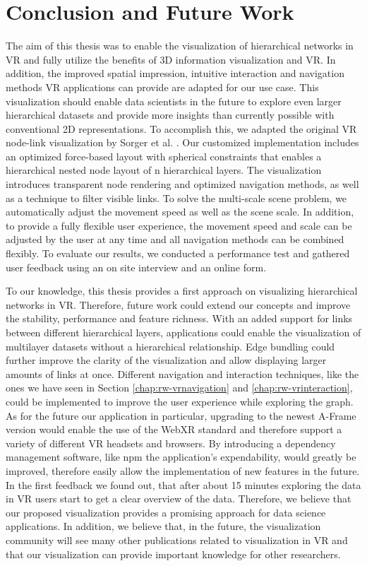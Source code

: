 \chapter{Conclusion and Future Work}
\label{chap:conclusion}

The aim of this thesis was to enable the visualization of hierarchical networks in VR and fully utilize the benefits of 3D information visualization and VR. In addition, the improved spatial impression, intuitive interaction and navigation methods VR applications can provide are adapted for our use case. 
This visualization should enable data scientists in the future to explore even larger hierarchical datasets and provide more insights than currently possible with conventional 2D representations.
To accomplish this, we adapted the original VR node-link visualization by Sorger et al. \cite{sorger_immersive_2019}. 
Our customized implementation includes an optimized force-based layout with spherical constraints that enables a hierarchical nested node layout of n hierarchical layers.
The visualization introduces transparent node rendering and optimized navigation methods, as well as a technique to filter visible links. 
To solve the multi-scale scene problem, we automatically adjust the movement speed as well as the scene scale.
In addition, to provide a fully flexible user experience, the movement speed and scale can be adjusted by the user at any time and all navigation methods can be combined flexibly.
To evaluate our results, we conducted a performance test and gathered user feedback using an on site interview and an online form.

To our knowledge, this thesis provides a first approach on visualizing hierarchical networks in VR. Therefore, future work could extend our concepts and improve the stability, performance and feature richness.
With an added support for links between different hierarchical layers, applications could enable the visualization of multilayer datasets without a hierarchical relationship. Edge bundling could further improve the clarity of the visualization and allow displaying larger amounts of links at once. Different navigation and interaction techniques, like the ones we have seen in Section \ref{chap:rw-vrnavigation} and \ref{chap:rw-vrinteraction}, could be implemented to improve the user experience while exploring the graph.
As for the future our application in particular, upgrading to the newest A-Frame version would enable the use of the WebXR standard and therefore support a variety of different VR headsets and browsers. By introducing a dependency management software, like npm the application's expendability, would greatly be improved, therefore easily allow the implementation of new features in the future.
In the first feedback we found out, that after about 15 minutes exploring the data in VR users start to get a clear overview of the data. Therefore, we believe that our proposed visualization provides a promising approach for data science applications. In addition, we believe that, in the future, the visualization community will see many other publications related to visualization in VR and that our visualization can provide important knowledge for other researchers.